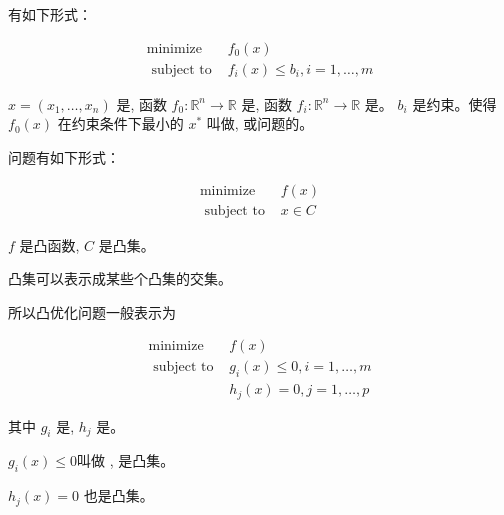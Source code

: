 \begin{definition}[优化问题]
    有如下形式：

    $$
\begin{array}{ll}
\operatorname{minimize} & f_{0}(x) \\
\text { subject to } & f_{i}(x) \leqslant b_{i}, i=1, \ldots, m
\end{array}
$$

$ x=\left(x_{1}, \ldots, x_{n}\right) $ 是, 函数 $ f_{0}: \mathbb{R}^{n} \rightarrow \mathbb{R} $ 是, 函数 $ f_{i}: \mathbb{R}^{n} \rightarrow \mathbb{R} $ 是。 $ b_{i} $ 是约束。使得 $ f_{0}(x) $ 在约束条件下最小的 $ x^{*} $ 叫做, 或问题的。
\end{definition}

\begin{definition}[凸优化]
    问题有如下形式：

    $$
    \begin{array}{ll}
    \operatorname{minimize} & f(x) \\
    \text { subject to } & x \in C
    \end{array}
    $$
    
    $ f $ 是凸函数, $ C $ 是凸集。
\end{definition}

\begin{corollary}
    凸集可以表示成某些个凸集的交集。
\end{corollary}

所以凸优化问题一般表示为

\begin{definition}[凸优化问题]
    \label{def:convex-problem}

    $$
    \begin{array}{ll}
    \operatorname{minimize} & f(x) \\
    \text { subject to } & g_{i}(x) \leqslant 0, i=1, \ldots, m \\
    & h_{j}(x)=0, j=1, \ldots, p
    \end{array}
    $$

    其中 $ g_{i} $ 是, $ h_{j} $ 是。 
\end{definition}

$ g_{i}(x) \leqslant 0 $叫做 , 是凸集。

\begin{theorem}
    $ h_{j}(x)=0 $ 也是凸集。
\end{theorem}

